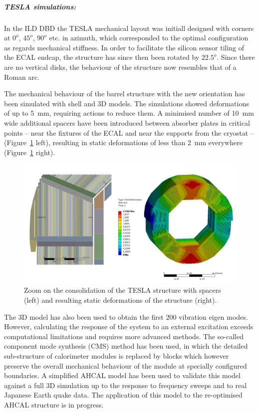 \subparagraph{\textbf{TESLA simulations:}} 

In the ILD DBD the TESLA mechanical layout was initiall designed with corners at $0^{o}$, $45^{o}$, $90^{o}$ etc. in azimuth, which corresponded to the optimal configuration as regards mechanical stiffness. In order to facilitate the silicon sensor tiling of the ECAL endcap, the structure has since then been rotated by $22.5^{o}$. Since there are no vertical disks, the behaviour of the structure now resembles that of a Roman arc. 

The mechanical behaviour of the barrel structure with the new orientation has been simulated with shell and 3D models. The simulations showed deformations of up to 5~mm, requiring actions to reduce them. A minimised number of 10~mm wide additional spacers have been introduced between absorber plates in critical points -- near the fixtures of the ECAL and near the supports from the cryostat -- (Figure~\ref{fig:integration:Tesla_deformations} left), resulting in static deformations of less than 2~mm everywhere (Figure~\ref{fig:integration:Tesla_deformations} right). 

\begin{figure}[t!]
\centering
\includegraphics[width=1.0\hsize]{Integration/fig/Tesla_studies.jpg}
\caption{\label{fig:integration:Tesla_deformations}Zoom on the consolidation of the TESLA structure with spacers (left) and resulting static deformations of the structure (right).}
\end{figure}

The 3D model has also been used to obtain the first 200 vibration eigen modes. However, calculating the response of the system to an external excitation exceeds computational limitations and requires more advanced methods. 
The so-called component mode synthesis (CMS) method has been used, in which the detailed sub-structure of calorimeter modules is replaced by blocks which however preserve the overall mechanical behaviour of the module at specially configured boundaries. 
A simplified AHCAL model has been used to validate this model against a full 3D simulation up to the response to frequency sweeps and to real Japanese Earth quake data. 
The application of this model to the re-optimised AHCAL structure is in progress. 

